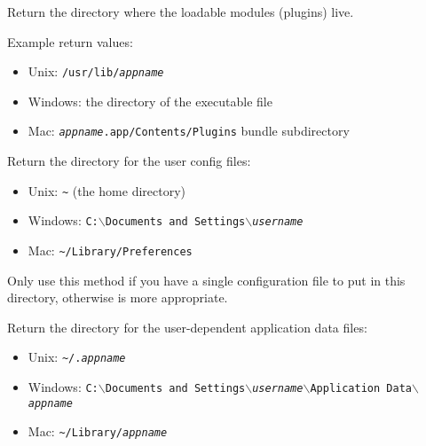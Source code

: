 \label{wxstandardsathsgetpluginsdir}


Return the directory where the loadable modules (plugins) live.

Example return values:
\begin{itemize}
    \item Unix: \texttt{/usr/lib/\textit{appname}}
    \item Windows: the directory of the executable file
    \item Mac: \texttt{\textit{appname}.app/Contents/Plugins} bundle subdirectory
\end{itemize}




\label{wxstandardsathsgetuserconfigdir}


Return the directory for the user config files:
\begin{itemize}
    \item Unix: \texttt{\verb|~|} (the home directory)
    \item Windows: \texttt{C:$\backslash$Documents and Settings$\backslash$\textit{username}}
    \item Mac: \texttt{\verb|~|/Library/Preferences}
\end{itemize}

Only use this method if you have a single configuration file to put in this
directory, otherwise  is
more appropriate.


\label{wxstandardsathsgetuserdatadir}


Return the directory for the user-dependent application data files:
\begin{itemize}
    \item Unix: \texttt{\verb|~|/.\textit{appname}}
    \item Windows: \texttt{C:$\backslash$Documents and Settings$\backslash$\textit{username}$\backslash$Application Data$\backslash$\textit{appname}}
    \item Mac: \texttt{\verb|~|/Library/\textit{appname}}
\end{itemize}


